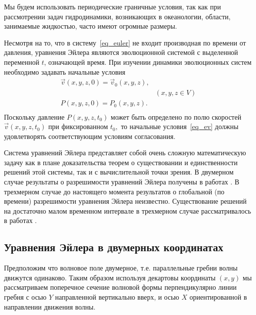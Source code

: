 Мы будем использовать периодические граничные условия, так как при рассмотрении задач гидродинамики, возникающих в океанологии, области, занимаемые жидкостью, часто имеют огромные размеры.

Несмотря на то, что в систему~\eqref{eq_euler} не входит
производная по времени от давления, уравнения Эйлера являются
эволюционной системой с выделенной переменной $t$, означающей
время. При изучении динамики эволюционных систем необходимо
задавать начальные условия
\begin{equation}\label{eq_ev}
\begin{array}{cc}
\overrightarrow v(x,y,z, 0)=\overrightarrow v_0(x,y,z), &  \\
 & (x,y,z\in V) \\
P(x,y,z,0)=P_0(x,y,z).  & \\
\end{array}
\end{equation}
Поскольку давление $P(x,y,z,t_0)$ может быть определено по полю
скоростей $\overrightarrow v(x,y,z, t_0)$ при фиксированном $t_0,$ то
начальные условия~\eqref{eq_ev} должны удовлетворять
соответствующим условиям согласования.

Система уравнений Эйлера представляет собой очень сложную
математическую задачу как в плане доказательства теорем о
существовании и единственности решений этой системы, так и с
вычислительной точки зрения. В двумерном случае результаты о
разрешимости уравнений Эйлера получены в работах \cite{Udo,Kato}.
В трехмерном случае до настоящего момента результатов о глобальной
(по времени) разрешимости уравнения Эйлера неизвестно.
Существование решений на достаточно малом временном интервале в
трехмерном случае рассматривалось в работах \cite{Gunter,Lich}.

\subsection{Уравнения Эйлера в двумерных координатах}\label{linTheory}

Предположим что волновое поле двумерное, т.е. параллельные гребни волны движутся одинаково. Таким образом используя декартовы координаты $(x,y)$ мы рассматриваем поперечное сечение волновой формы перпендикулярно линии гребня с осью $Y$ направленной вертикально вверх, и осью $X$ ориентированной в направлении движения волны.


